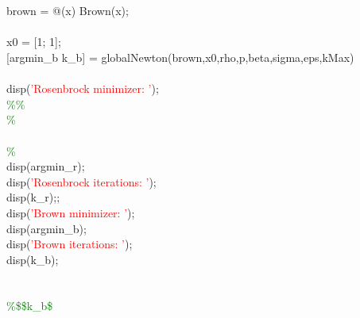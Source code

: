 \hspace{1mm} \\ 
\hspace{1mm} \\ 
\hspace{1mm}brown = @(x) Brown(x); \\ 
\hspace{1mm} \\ 
\hspace{1mm}x0 = [1; 1]; \\ 
\hspace{1mm}[argmin\_b k\_b] = globalNewton(brown,x0,rho,p,beta,sigma,eps,kMax) \\ 
\hspace{1mm} \\ 
\hspace{1mm}disp(\textcolor{red}{'Rosenbrock minimizer: '}); \\ 
\hspace{1mm}\textcolor{green}{\%}\textcolor{green}{\% }\\ 
\hspace{1mm}\textcolor{green}{\%  }\\ 
\hspace{1mm} \\ 
\hspace{1mm}\textcolor{green}{\%  }\\ 
\hspace{1mm}disp(argmin\_r); \\ 
\hspace{1mm}disp(\textcolor{red}{'Rosenbrock iterations: '}); \\ 
\hspace{1mm}disp(k\_r);; \\ 
\hspace{1mm}disp(\textcolor{red}{'Brown minimizer: '}); \\ 
\hspace{1mm}disp(argmin\_b); \\ 
\hspace{1mm}disp(\textcolor{red}{'Brown iterations: '}); \\ 
\hspace{1mm}disp(k\_b); \\ 
\hspace{1mm} \\ 
\hspace{1mm} \\ 
\hspace{1mm}\textcolor{green}{\%\$\$k\_b\$ }\\ 
